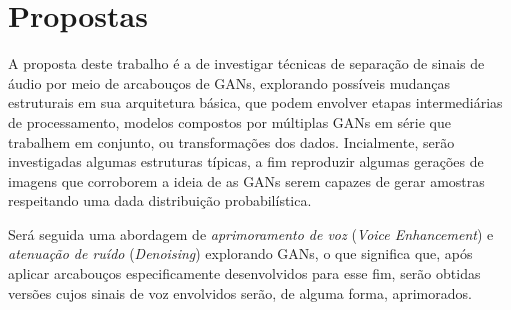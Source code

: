 \section{Propostas}
\label{sec:gan_for_bss_propositions}

A proposta deste trabalho é a de investigar técnicas de separação de sinais de áudio por meio de arcabouços de GANs, explorando possíveis mudanças estruturais em sua arquitetura básica, que podem envolver etapas intermediárias de processamento, modelos compostos por múltiplas GANs em série que trabalhem em conjunto, ou transformações dos dados. Incialmente, serão investigadas algumas estruturas típicas, a fim reproduzir algumas gerações de imagens que corroborem a ideia de as GANs serem capazes de gerar amostras respeitando uma dada distribuição probabilística. 

Será seguida uma abordagem de \textit{aprimoramento de voz}  (\textit{Voice Enhancement}) e \textit{atenuação de ruído} (\textit{Denoising}) explorando GANs, o que significa que, após aplicar arcabouços especificamente desenvolvidos para esse fim, serão obtidas versões cujos sinais de voz envolvidos serão, de alguma forma, aprimorados.